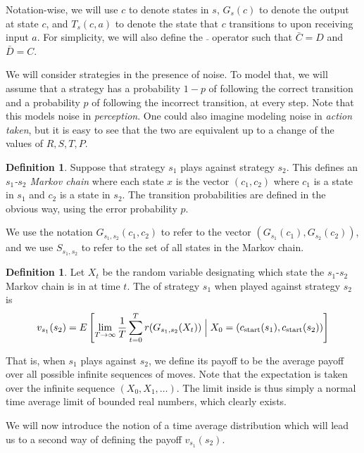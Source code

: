 \documentclass[11pt]{amsart}
\theoremstyle{definition}
\newtheorem{definition}[theorem]{Definition}
\theoremstyle{remark}
\begin{document}
Notation-wise, we will use $c$ to denote states in $s$, $G_s(c)$ to denote the output at state $c$, and $T_s(c, a)$ to denote the state that $c$ transitions to upon receiving input $a$. For simplicity, we will also define the $\bar{\;}$ operator such that $\bar{C} = D$ and $\bar{D} = C$.

We will consider strategies in the presence of noise. To model that, we will assume that a strategy has a probability $1-p$ of following the correct transition and a probability $p$ of following the incorrect transition, at every step. Note that this models noise in \textit{perception}. One could also imagine modeling noise in \textit{action taken}, but it is easy to see that the two are equivalent up to a change of the values of $R, S, T, P$.

\begin{definition}
  Suppose that strategy $s_1$ plays against strategy $s_2$. This defines an \textit{$s_1$-$s_2$ Markov chain} where each state $x$ is the vector $(c_1,c_2)$ where $c_1$ is a state in $s_1$ and $c_2$ is a state in $s_2$. The transition probabilities are defined in the obvious way, using the error probability $p$.
\end{definition}

We use the notation $G_{s_1,s_2}(c_1,c_2)$ to refer to the vector $(G_{s_1}(c_1), G_{s_2}(c_2))$, and we use $S_{s_1,s_2}$ to refer to the set of all states in the Markov chain.

\begin{definition}
  \label{strategypayoffs}
  Let $X_t$ be the random variable designating which state the $s_1$-$s_2$ Markov chain is in at time $t$. The  of strategy $s_1$ when played against strategy $s_2$ is 
  \begin{equation*}
    v_{s_1}(s_2) = E \left[ \lim_{T \to \infty} \frac{1}{T} \sum_{t=0}^T r(G_{s_1,s_2} (X_t)) \Bigm| X_0 = (c_{\text{start}}(s_1), c_{\text{start}}(s_2)) \right]
  \end{equation*}
\end{definition}

That is, when $s_1$ plays against $s_2$, we define its payoff to be the average payoff over all possible infinite sequences of moves. Note that the expectation is taken over the infinite sequence $(X_0, X_1, \ldots)$. The limit inside is thus simply a normal time average limit of bounded real numbers, which clearly exists. 

We will now introduce the notion of a time average distribution which will lead us to a second way of defining the payoff $v_{s_1}(s_2)$. 
\end{document}
